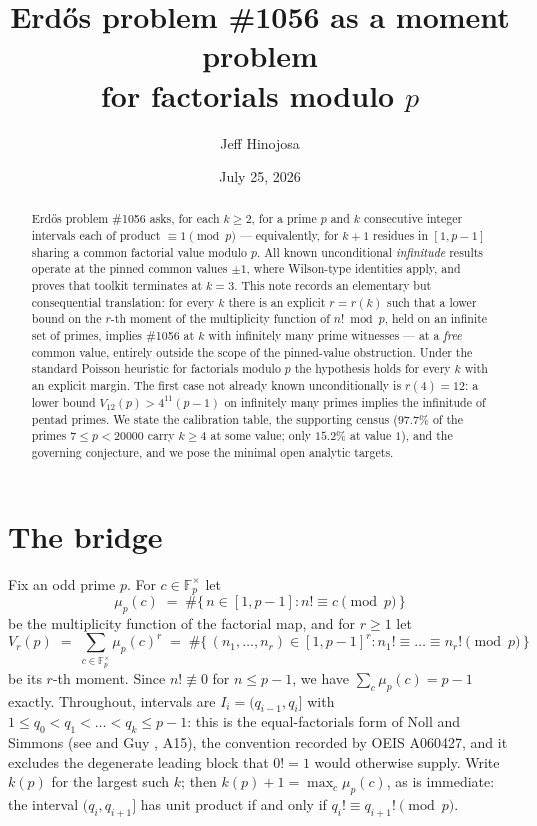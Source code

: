 \documentclass[11pt]{article}
\title{Erd\H{o}s problem \#1056 as a moment problem\\ for factorials modulo $p$}
\author{Jeff Hinojosa}
\date{July 25, 2026}
\theoremstyle{definition}
\theoremstyle{remark}
\newcommand{\F}{\mathbb{F}}
\begin{document}
\maketitle

{\let\thefootnote\relax{}}

\begin{abstract}
Erd\H{o}s problem \#1056 asks, for each $k \ge 2$, for a prime $p$ and $k$
consecutive integer intervals each of product $\equiv 1 \pmod p$ ---
equivalently, for $k+1$ residues in $[1, p-1]$ sharing a common factorial
value modulo $p$. All known unconditional \emph{infinitude} results operate
at the pinned common values $\pm 1$, where Wilson-type identities apply,
and \cite{Hino} proves that toolkit terminates at $k = 3$. This note records an elementary
but consequential translation: for every $k$ there is an explicit $r = r(k)$
such that a lower bound on the $r$-th moment of the multiplicity function of
$n! \bmod p$, held on an infinite set of primes, implies \#1056 at $k$ with
infinitely many prime witnesses --- at a \emph{free} common value, entirely
outside the scope of the pinned-value obstruction. Under the standard
Poisson heuristic for factorials modulo $p$ the hypothesis holds for every
$k$ with an explicit margin. The first case not already known
unconditionally is $r(4) = 12$: a lower bound
$V_{12}(p) > 4^{11}(p-1)$ on infinitely many primes implies the infinitude
of pentad primes. We state the calibration table, the supporting census
($97.7\%$ of the primes $7 \le p < 20000$ carry $k \ge 4$ at some value;
only $15.2\%$ at value $1$), and the governing conjecture, and we pose the
minimal open analytic targets.
\end{abstract}

\section{The bridge}

Fix an odd prime $p$. For $c \in \F_p^\times$ let
\[
  \mu_p(c) \;=\; \#\{\, n \in [1, p-1] : n! \equiv c \pmod p \,\}
\]
be the multiplicity function of the factorial map, and for $r \ge 1$ let
\[
  V_r(p) \;=\; \sum_{c \in \F_p^\times} \mu_p(c)^r
  \;=\; \#\{\, (n_1, \dots, n_r) \in [1, p-1]^r :
    n_1! \equiv \dots \equiv n_r! \pmod p \,\}
\]
be its $r$-th moment. Since $n! \not\equiv 0$ for $n \le p-1$, we have
$\sum_c \mu_p(c) = p - 1$ exactly. Throughout, intervals are
$I_i = (q_{i-1}, q_i]$ with $1 \le q_0 < q_1 < \dots < q_k \le p-1$: this
is the equal-factorials form of Noll and Simmons (see \cite{EP} and
Guy \cite{Gu04}, A15), the convention recorded by OEIS A060427, and it
excludes the degenerate leading block that $0! = 1$ would otherwise
supply. Write $k(p)$ for the largest such $k$; then
$k(p) + 1 = \max_c \mu_p(c)$, as is immediate: the interval
$(q_i, q_{i+1}]$ has unit product if and only if
$q_i! \equiv q_{i+1}! \pmod p$.
\end{document}
